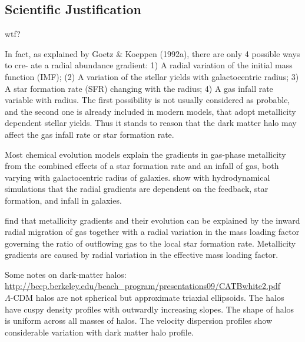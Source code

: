 \documentclass[11pt, a4paper, onecolumn]{article}
\begin{document}

\begin{multicols}{2}

\section{Scientific Justification}

    wtf?

    \citet{sanchez12} In fact, as explained by Goetz \& Koeppen (1992a), there
    are only 4 possible ways to cre- ate a radial abundance gradient: 1) A
    radial variation of the initial mass function (IMF); (2) A variation of the
    stellar yields with galactocentric radius; 3) A star formation rate (SFR)
    changing with the radius; 4) A gas infall rate variable with radius.  The
    first possibility is not usually considered as probable, and the second one
    is already included in modern models, that adopt metallicity dependent
    stellar yields. Thus it stands to reason that the dark matter halo may
    affect the gas infall rate or star formation rate.

    Most chemical evolution models explain the gradients in gas-phase
    metallicity from the combined effects of a star formation rate and an
    infall of gas, both varying with galactocentric radius of galaxies.
    \citet{gibson13} show with hydrodynamical simulations that the radial
    gradients are dependent on the feedback, star formation, and infall in
    galaxies.

    \citet{jones12}  find that metallicity gradients and their evolution can be
    explained by the inward radial migration of gas together with a radial
    variation in the mass loading factor governing the ratio of outflowing gas
    to the local star formation rate. Metallicity gradients are caused by
    radial variation in the effective mass loading factor.


    Some notes on dark-matter halos:\\
    \url{http://bccp.berkeley.edu/beach_program/presentations09/CATBwhite2.pdf}\\
    $\Lambda$-CDM halos are not spherical but approximate triaxial ellipsoids.
    The halos have cuspy density profiles with outwardly increasing slopes.
    The shape of halos is uniform across all masses of halos.  The velocity
    dispersion profiles show considerable variation with dark matter halo
    profile.


\end{multicols}
\end{document}
